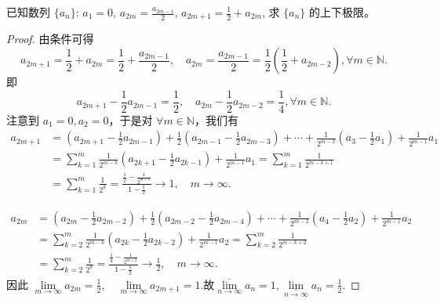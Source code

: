 \documentclass[lang=cn,newtx,10pt,scheme=chinese]{../Template/elegantbook}
\begin{document}
\begin{example}
已知数列 $\{a_n\}$: $a_1 = 0$, $a_{2m} = \frac{a_{2m-1}}{2}$, $a_{2m+1} = \frac{1}{2} + a_{2m}$, 求 $\{a_n\}$ 的上下极限。
\end{example}
\begin{proof}
由条件可得  
\[
a_{2m+1}=\frac{1}{2}+a_{2m}=\frac{1}{2}+\frac{a_{2m-1}}{2},\quad a_{2m}=\frac{a_{2m-1}}{2}=\frac{1}{2}\left( \frac{1}{2}+a_{2m-2} \right),\forall m\in \mathbb{N}.
\]
即  
\[
a_{2m+1}-\frac{1}{2}a_{2m-1}=\frac{1}{2},\quad a_{2m}-\frac{1}{2}a_{2m-2}=\frac{1}{4},\forall m\in \mathbb{N}.
\]
注意到 $a_1=0,a_2=0$，于是对 $\forall m\in \mathbb{N}$，我们有  
\begin{align*}
a_{2m+1}&=\left( a_{2m+1}-\frac{1}{2}a_{2m-1} \right) +\frac{1}{2}\left( a_{2m-1}-\frac{1}{2}a_{2m-3} \right) +\cdots +\frac{1}{2^{m-2}}\left( a_3-\frac{1}{2}a_1 \right) +\frac{1}{2^{m-1}}a_1 \\
&=\sum_{k=1}^m{\frac{1}{2^{m-k}}\left( a_{2k+1}-\frac{1}{2}a_{2k-1} \right)}+\frac{1}{2^{m-1}}a_1=\sum_{k=1}^m{\frac{1}{2^{m-k+1}}} \\
&=\sum_{k=1}^m{\frac{1}{2^k}}=\frac{\frac{1}{2}-\frac{1}{2^{m+1}}}{1-\frac{1}{2}}\rightarrow 1,\quad m\rightarrow \infty.
\end{align*}

\begin{align*}
a_{2m}&=\left( a_{2m}-\frac{1}{2}a_{2m-2} \right) +\frac{1}{2}\left( a_{2m-2}-\frac{1}{2}a_{2m-4} \right) +\cdots +\frac{1}{2^{m-2}}\left( a_4-\frac{1}{2}a_2 \right) +\frac{1}{2^{m-1}}a_2 \\
&=\sum_{k=2}^m{\frac{1}{2^{m-k}}\left( a_{2k}-\frac{1}{2}a_{2k-2} \right)}+\frac{1}{2^{m-1}}a_2=\sum_{k=2}^m{\frac{1}{2^{m-k+2}}} \\
&=\sum_{k=2}^m{\frac{1}{2^k}}=\frac{\frac{1}{4}-\frac{1}{2^{m+2}}}{1-\frac{1}{2}}\rightarrow \frac{1}{2},\quad m\rightarrow \infty.
\end{align*}
因此  
$\underset{m\rightarrow \infty}{\lim}a_{2m}=\frac{1}{2},\quad \underset{m\rightarrow \infty}{\lim}a_{2m+1}=1$.故$\underset{n\rightarrow \infty}{\overline{\lim }}a_n=1,\underset{n\rightarrow \infty}{\underline{\lim }}a_n=\frac{1}{2}.$

\end{proof}
\end{document}
